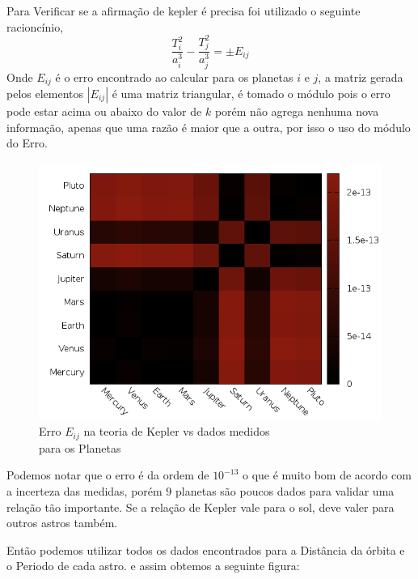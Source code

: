 \documentclass[a4paper,12pt]{exam}
\begin{document}
	Para Verificar se a afirmação de kepler é precisa foi utilizado o seguinte racioncínio,\\
	\[ \frac{T_{i}^2}{a_{i}^3} - \frac{T_{j}^2}{a_{j}^3} = \pm E_{ij} \] 
	Onde $E_{ij}$ é o erro encontrado ao calcular para os planetas $i$ e $j$, a matriz gerada pelos elementos $| E_{ij} |$ é uma matriz triangular, é tomado o módulo pois 
	o erro pode estar acima ou abaixo do valor de $k$ porém não agrega nenhuma nova informação, apenas que uma razão é maior que a outra, por isso o uso do módulo do Erro.\\
	\begin{figure}[h]
		\centering
		\includegraphics[scale=0.34]{8o0.png}
		\caption{ Erro $E_{ij}$ na teoria de Kepler vs dados medidos \\ para os Planetas}
	\end{figure}

	Podemos notar que o erro é da ordem de $10^{-13}$ o que é muito bom de acordo com a incerteza das medidas, porém 9 planetas são poucos dados para validar uma relação tão importante.
	Se a relação de Kepler vale para o sol, deve valer para outros astros também.
	
	Então podemos utilizar todos os dados encontrados para a Distância da órbita e o Periodo de cada astro.
	e assim obtemos a seguinte figura:
	
\end{document}
